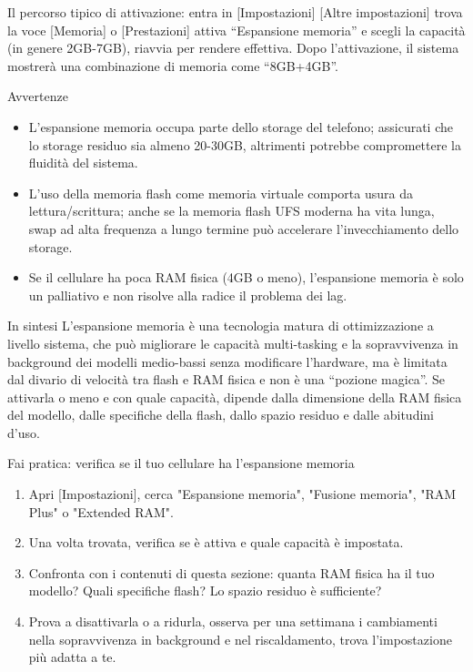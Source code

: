 Il percorso tipico di attivazione: entra in [Impostazioni] [Altre impostazioni] trova la voce [Memoria] o [Prestazioni] attiva “Espansione memoria” e scegli la capacità (in genere 2GB-7GB), riavvia per rendere effettiva. Dopo l'attivazione, il sistema mostrerà una combinazione di memoria come “8GB+4GB”.

\begin{tcbwarn}{Avvertenze}
\begin{itemize}
  \item L'espansione memoria occupa parte dello storage del telefono; assicurati che lo storage residuo sia almeno 20-30GB, altrimenti potrebbe compromettere la fluidità del sistema.
  \item L'uso della memoria flash come memoria virtuale comporta usura da lettura/scrittura; anche se la memoria flash UFS moderna ha vita lunga, swap ad alta frequenza a lungo termine può accelerare l'invecchiamento dello storage.
  \item Se il cellulare ha poca RAM fisica (4GB o meno), l'espansione memoria è solo un palliativo e non risolve alla radice il problema dei lag.
\end{itemize}

\end{tcbwarn}

\begin{tcbinfo}{In sintesi}
L'espansione memoria è una tecnologia matura di ottimizzazione a livello sistema, che può migliorare le capacità multi-tasking e la sopravvivenza in background dei modelli medio-bassi senza modificare l'hardware, ma è limitata dal divario di velocità tra flash e RAM fisica e non è una “pozione magica”. Se attivarla o meno e con quale capacità, dipende dalla dimensione della RAM fisica del modello, dalle specifiche della flash, dallo spazio residuo e dalle abitudini d'uso.

\end{tcbinfo}

\begin{tcbpractice}{Fai pratica: verifica se il tuo cellulare ha l'espansione memoria}
\begin{enumerate}
  \item Apri [Impostazioni], cerca "Espansione memoria", "Fusione memoria", "RAM Plus" o "Extended RAM".
  \item Una volta trovata, verifica se è attiva e quale capacità è impostata.
  \item Confronta con i contenuti di questa sezione: quanta RAM fisica ha il tuo modello? Quali specifiche flash? Lo spazio residuo è sufficiente?
  \item Prova a disattivarla o a ridurla, osserva per una settimana i cambiamenti nella sopravvivenza in background e nel riscaldamento, trova l'impostazione più adatta a te.
\end{enumerate}

\end{tcbpractice}

